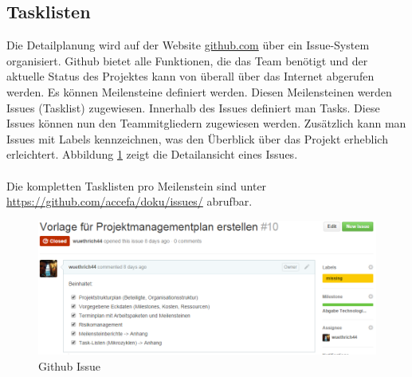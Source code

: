 \subsection{Tasklisten}

Die Detailplanung wird auf der Website \href{https://github.com/accefa}{github.com} über ein Issue-System organisiert. Github bietet alle Funktionen, die das Team benötigt und der aktuelle Status des Projektes kann von überall über das Internet abgerufen werden. Es können Meilensteine definiert werden. Diesen Meilensteinen werden Issues (Tasklist) zugewiesen. Innerhalb des Issues definiert man Tasks. Diese Issues können nun den Teammitgliedern zugewiesen werden. Zusätzlich kann man Issues mit Labels kennzeichnen, was den Überblick über das Projekt erheblich erleichtert. Abbildung \ref{fig:github-issue} zeigt die Detailansicht eines Issues. \\ \\
Die kompletten Tasklisten pro Meilenstein sind unter \href{https://github.com/accefa/doku/issues/}{https://github.com/accefa/doku/issues/} abrufbar.

\begin{figure}[!h]
\centering
\includegraphics[width=0.7\linewidth]{../../fig/github-issue}
\caption{Github Issue}
\label{fig:github-issue}
\end{figure}
